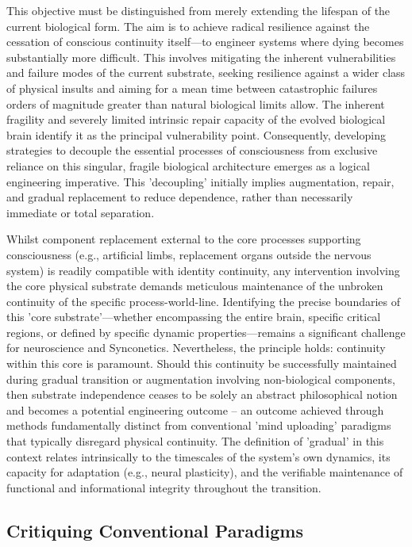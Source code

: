 \documentclass[10pt]{article}
\begin{document}
\begin{sloppypar}
  This objective must be distinguished from merely extending the lifespan of the current biological form. The aim is to achieve radical resilience against the cessation of conscious continuity itself—to engineer systems where dying becomes substantially more difficult. This involves mitigating the inherent vulnerabilities and failure modes of the current substrate, seeking resilience against a wider class of physical insults and aiming for a mean time between catastrophic failures orders of magnitude greater than natural biological limits allow. The inherent fragility and severely limited intrinsic repair capacity of the evolved biological brain identify it as the principal vulnerability point. Consequently, developing strategies to decouple the essential processes of consciousness from exclusive reliance on this singular, fragile biological architecture emerges as a logical engineering imperative. This 'decoupling' initially implies augmentation, repair, and gradual replacement to reduce dependence, rather than necessarily immediate or total separation.

  Whilst component replacement external to the core processes supporting consciousness (e.g., artificial limbs, replacement organs outside the nervous system) is readily compatible with identity continuity, any intervention involving the core physical substrate demands meticulous maintenance of the unbroken continuity of the specific process-world-line. Identifying the precise boundaries of this 'core substrate'—whether encompassing the entire brain, specific critical regions, or defined by specific dynamic properties—remains a significant challenge for neuroscience and Synconetics. Nevertheless, the principle holds: continuity within this core is paramount. Should this continuity be successfully maintained during gradual transition or augmentation involving non-biological components, then substrate independence ceases to be solely an abstract philosophical notion and becomes a potential engineering outcome – an outcome achieved through methods fundamentally distinct from conventional 'mind uploading' paradigms that typically disregard physical continuity. The definition of 'gradual' in this context relates intrinsically to the timescales of the system's own dynamics, its capacity for adaptation (e.g., neural plasticity), and the verifiable maintenance of functional and informational integrity throughout the transition.

  \subsection{Critiquing Conventional Paradigms}
  \label{sec:new-paradigm}


\end{sloppypar}
\end{document}
